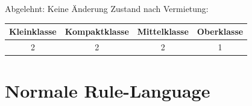 Abgelehnt: Keine Änderung
Zustand nach Vermietung:\\
\begin{tabular}{|c|c|c|c|}
	\hline \textbf{Kleinklasse} & \textbf{Kompaktklasse} & \textbf{Mittelklasse} & \textbf{Oberklasse}  \\ 
	\hline 2 & 2 & 2 & 1 \\ 
	\hline 
\end{tabular}

\section{Normale Rule-Language}
\label{anh:normal-rules}




